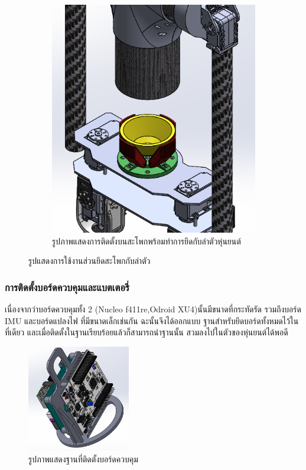 \begin{figure}[h!]
\begin{subfigure}[b]{0.4\linewidth}
    \includegraphics[width=\linewidth]{chapter4/images/explode_hipconnect.PNG}
    \caption{รูปภาพแสดงการติดตั้งบนสะโพกพร้อมทำการยึดกับลำตัวหุ่นยนต์}
  \end{subfigure}
  \caption{รูปแสดงการใช้งานส่วนยึดสะโพกกับลำตัว}
  \label{fig:barefoot_compilation}
\end{figure}
\clearpage
\subsubsection*{การติดตั้งบอร์ดควบคุมและแบตเตอรี่}
เนื่องจากว่าบอร์ดควบคุมทั้ง 2 (Nucleo f411re,Odroid XU4)นั้นมีขนาดที่กระทัดรัด รวมถึงบอร์ด IMU และบอร์ดแปลงไฟ ที่มีขนาดเล็กเช่นกัน ฉะนั้นจึงได้ออกแบบ
ฐานสำหรับยึดบอร์ดทั้งหมดไว้ในที่เดียว และเมื่อติดตั้งในฐานเรียบร้อยแล้วก็สามารถนำฐานนั้น สวมลงไปในตัวของหุ่นยนต์ได้พอดี
\begin{figure}[!ht]
  \centering
  \includegraphics[width=0.4\textwidth]{chapter4/images/board_hold.PNG}
  \caption{รูปภาพแสดงฐานที่ติดตั้งบอร์ดควบคุม}
  \label{fig:board_hold}
\end{figure}
 

